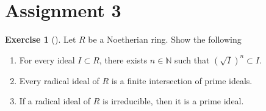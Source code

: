\documentclass[reqno]{amsart}
\theoremstyle{definition}
\newtheorem{exercise}[theorem]{Exercise}
\theoremstyle{remark}
\begin{document}
\section{Assignment 3}
    \begin{exercise}[]
        Let $R$ be a Noetherian ring. Show the following
        \begin{enumerate}
            \item For every ideal
                $I \subset R$, there exists $n \in \mathbb{N} $
                such that $\left( \sqrt{I}  \right)^{n}
                \subset I$.
            \item Every radical ideal of $R$ is a finite
                intersection of prime ideals.
            \item If a radical ideal of $R$ is irreducible,
                then it is a prime ideal.
        \end{enumerate}
    \end{exercise}
\end{document}
